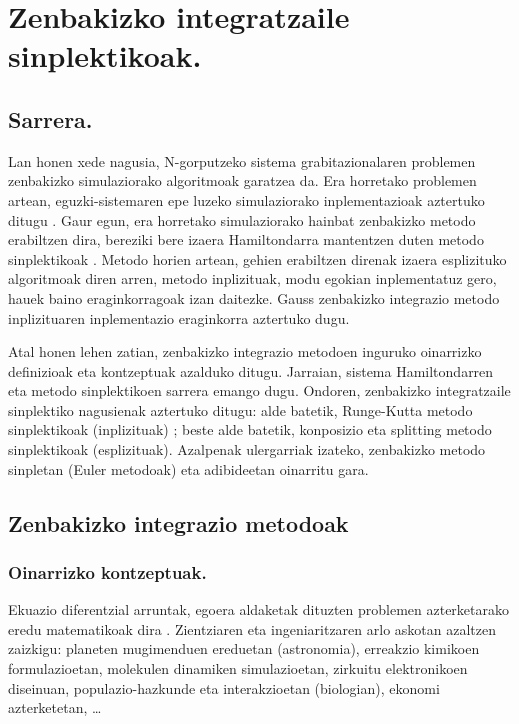 \chapter{Zenbakizko integratzaile sinplektikoak.}

\section{Sarrera.}

Lan honen xede nagusia, N-gorputzeko sistema grabitazionalaren problemen zenbakizko simulaziorako algoritmoak garatzea da. Era horretako problemen artean, eguzki-sistemaren epe luzeko simulaziorako inplementazioak aztertuko ditugu \cite{Kholshevnikov2007,Brumberg2013} . Gaur egun, era horretako simulaziorako hainbat zenbakizko metodo erabiltzen dira, bereziki bere izaera Hamiltondarra mantentzen duten metodo sinplektikoak \cite{Eggl2010,Saha1992,Farres2013}. Metodo horien artean, gehien erabiltzen direnak izaera esplizituko algoritmoak diren arren, metodo inplizituak, modu egokian inplementatuz gero, hauek baino eraginkorragoak izan daitezke. Gauss zenbakizko integrazio metodo inplizituaren inplementazio eraginkorra aztertuko dugu.   

Atal honen lehen zatian, zenbakizko integrazio metodoen inguruko oinarrizko definizioak eta kontzeptuak azalduko ditugu. 
Jarraian, sistema Hamiltondarren eta metodo sinplektikoen sarrera emango dugu. Ondoren, zenbakizko integratzaile sinplektiko nagusienak aztertuko ditugu: alde batetik, Runge-Kutta metodo sinplektikoak (inplizituak) ; beste alde batetik, konposizio eta splitting metodo sinplektikoak (esplizituak). Azalpenak ulergarriak izateko, zenbakizko metodo sinpletan (Euler metodoak) eta adibideetan oinarritu gara. 

\section{Zenbakizko integrazio metodoak}

\subsection{Oinarrizko kontzeptuak.}

Ekuazio diferentzial arruntak, egoera aldaketak dituzten problemen azterketarako eredu matematikoak dira \cite{Hairer2015}. Zientziaren eta ingeniaritzaren arlo askotan azaltzen zaizkigu: planeten mugimenduen ereduetan (astronomia), erreakzio kimikoen formulazioetan, molekulen dinamiken simulazioetan, zirkuitu elektronikoen diseinuan, populazio-hazkunde eta interakzioetan (biologian), ekonomi azterketetan, \ldots  

